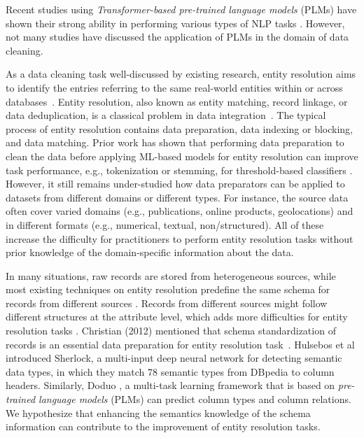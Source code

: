 Recent studies using \emph{Transformer-based pre-trained language models} (PLMs) have shown their strong ability in performing various types of NLP tasks \cite{min_recent_2021}. However, not many studies have discussed the application of PLMs in the domain of data cleaning. 

As a data cleaning task well-discussed by existing research, entity resolution aims to identify the entries referring to the same real-world entities within or across databases~\cite{christen_data_2012}. Entity resolution, also known as entity matching, record linkage, or data deduplication, is a classical problem in data integration~\cite{zhao_auto-em_2019}. The typical process of entity resolution contains data preparation, data indexing or blocking, and data matching. %
Prior work has shown that performing data preparation to clean the data before applying ML-based models for entity resolution can improve task performance,  e.g., tokenization or stemming, for threshold-based classifiers \cite{koumarelas_data_2020}. However, it still remains under-studied how data preparators can be applied to datasets from different domains or different types. For instance, the source data often cover varied domains (e.g., publications, online products, geolocations) and in different formats (e.g., numerical, textual, non/structured). All of these increase the difficulty for practitioners to perform entity resolution tasks without prior knowledge of the domain-specific information about the data.

In many situations, raw records are stored from heterogeneous sources, while most existing techniques on entity resolution predefine the same schema for records from different sources \cite{elmagarmid_duplicate_2007}. Records from different sources might follow different structures at the attribute level, which adds more difficulties for entity resolution tasks \cite{enriquez_entity_2017, arabnia_when_2021}. Christian (2012) mentioned that schema standardization of records is an essential data preparation for entity resolution task~\cite{christen_data_2012}. Hulsebos et al \cite{hulsebos_sherlock_2019} introduced Sherlock, a multi-input deep neural network for detecting semantic data types, in which they match 78 semantic types from DBpedia to column headers.  Similarly, Doduo \cite{suhara_annotating_2022}, a multi-task learning framework that is based on
\emph{pre-trained language models} (PLMs) can predict column types and column relations. We hypothesize that enhancing the semantics knowledge of the schema information can contribute to the improvement of entity resolution tasks.  

